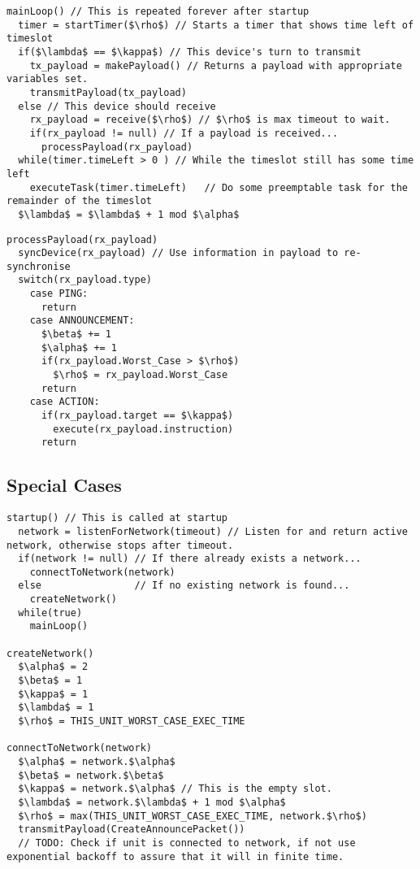 \begin{lstlisting}[style=customc,mathescape=true,caption={Pseudocode example of the main loop}]  
mainLoop() // This is repeated forever after startup
  timer = startTimer($\rho$) // Starts a timer that shows time left of timeslot
  if($\lambda$ == $\kappa$) // This device's turn to transmit
  	tx_payload = makePayload() // Returns a payload with appropriate variables set.
  	transmitPayload(tx_payload)
  else // This device should receive
  	rx_payload = receive($\rho$) // $\rho$ is max timeout to wait. 
  	if(rx_payload != null) // If a payload is received...
  	  processPayload(rx_payload)
  while(timer.timeLeft > 0 ) // While the timeslot still has some time left
    executeTask(timer.timeLeft)   // Do some preemptable task for the remainder of the timeslot
  $\lambda$ = $\lambda$ + 1 mod $\alpha$   
\end{lstlisting}  

\begin{lstlisting}[style=customc,mathescape=true,caption={Pseudocode example of the method that processes the payload}]  
processPayload(rx_payload)
  syncDevice(rx_payload) // Use information in payload to re-synchronise
  switch(rx_payload.type)
    case PING:
      return
    case ANNOUNCEMENT:
      $\beta$ += 1
      $\alpha$ += 1
      if(rx_payload.Worst_Case > $\rho$)
        $\rho$ = rx_payload.Worst_Case
      return
    case ACTION:
      if(rx_payload.target == $\kappa$)
        execute(rx_payload.instruction)
      return         
\end{lstlisting}

\subsection{Special Cases} %
\label{sub:special_cases} 


\begin{lstlisting}[style=customc,mathescape=true,caption={Pseudocode example of special case functions}]
startup() // This is called at startup                                           
  network = listenForNetwork(timeout) // Listen for and return active network, otherwise stops after timeout.
  if(network != null) // If there already exists a network...
    connectToNetwork(network)
  else                // If no existing network is found...
    createNetwork()
  while(true)
    mainLoop()
  
createNetwork()
  $\alpha$ = 2
  $\beta$ = 1
  $\kappa$ = 1
  $\lambda$ = 1
  $\rho$ = THIS_UNIT_WORST_CASE_EXEC_TIME
  
connectToNetwork(network)
  $\alpha$ = network.$\alpha$
  $\beta$ = network.$\beta$
  $\kappa$ = network.$\alpha$ // This is the empty slot.
  $\lambda$ = network.$\lambda$ + 1 mod $\alpha$
  $\rho$ = max(THIS_UNIT_WORST_CASE_EXEC_TIME, network.$\rho$)
  transmitPayload(CreateAnnouncePacket())
  // TODO: Check if unit is connected to network, if not use exponential backoff to assure that it will in finite time.
\end{lstlisting}   
